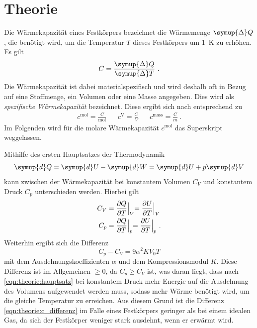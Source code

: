 \section{Theorie}
\label{sec:theorie}

    Die Wärmekapazität eines Festkörpers bezeichnet die Wärmemenge $\symup{\Delta} Q$,
    die benötigt wird,
    um die Temperatur $T$ dieses Festkörpers um \SI{1}{\kelvin} zu erhöhen.
    Es gilt
    \begin{equation*}
        C = \frac{\symup{\Delta}Q}{\symup{\Delta}T} \ .
    \end{equation*}
    Die Wärmekapazität ist dabei materialspezifisch und wird deshalb oft in Bezug auf eine Stoffmenge,
    ein Volumen oder eine Masse angegeben.
    Dies wird als \textit{spezifische Wärmekapazität} bezeichnet.
    Diese ergibt sich nach \cite{grossmarx} entsprechend zu
    \begin{align*}
        c^\text{mol} = \frac{C}{\si{\mol}} && c^\text{V} = \frac{C}{V} && c^\text{mass} = \frac{C}{m} \ .
    \end{align*}
    Im Folgenden wird für die molare Wärmekapazität $c^\text{mol}$ das Superskript weggelassen.

    Mithilfe des ersten Hauptsatzes der Thermodynamik
    \begin{equation}
        \symup{d}Q = \symup{d}U - \symup{d}W = \symup{d}U + p\symup{d}V
        \label{eqn:theorie:hauptsatz}
    \end{equation}
    kann zwischen der Wärmekapazität bei konstantem Volumen $C_V$ und konstantem Druck $C_p$ unterschieden werden.
    Hierbei gilt
    \begin{align}
        C_V &= \frac{\partial Q}{\partial T} \Bigl|_V = \frac{\partial U}{\partial T} \Bigl|_V
        \\
        C_p &= \frac{\partial Q}{\partial T} \Bigl|_p = \frac{\partial U}{\partial T} \Bigl|_p \ .
        \label{eqn:theorie:c_p}
    \end{align}
    Weiterhin ergibt sich die Differenz
    \begin{equation}
        C_p - C_V
        = 9 \alpha^2 K V_0 T %
        \label{eqn:theorie:c_differenz}
    \end{equation}
    mit dem Ausdehnungskoeffizienten $\alpha$ und dem Kompressionsmodul $K$.
    Diese Differenz ist im Allgemeinen $\geq 0$,
    da $C_p \geq C_V$ ist,
    was daran liegt,
    dass nach \autoref{eqn:theorie:hauptsatz} bei konstantem Druck mehr Energie auf die Ausdehnung des Volumens aufgewendet werden muss,
    sodass mehr Wärme benötigt wird,
    um die gleiche Temperatur zu erreichen.
    Aus diesem Grund ist die Differenz \autoref{eqn:theorie:c_differenz} im Falle eines Festkörpers geringer als bei einem idealen Gas,
    da sich der Festkörper weniger stark ausdehnt,
    wenn er erwärmt wird.

